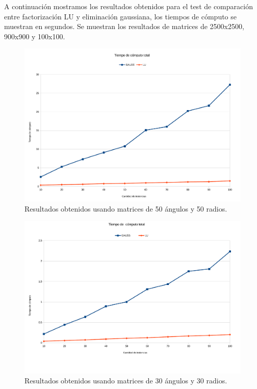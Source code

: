 A continuación mostramos los resultados obtenidos para el test de comparación entre factorización LU y eliminación gaussiana, los tiempos de cómputo se muestran en segundos. Se muestran los resultados de matrices de 2500x2500, 900x900 y 100x100. 


\begin{figure}[H]{}
\centering
\includegraphics[scale=0.5]{graphs/gaussVsLU1.pdf}
\caption{Resultados obtenidos usando matrices de 50 ángulos y 50 radios.}
\label{gaussVsLU1}
\end{figure}

\begin{figure}[H]{}
\centering
\includegraphics[scale=0.5]{graphs/gaussVsLU2.pdf}
\caption{Resultados obtenidos usando matrices de 30 ángulos y 30 radios.}
\label{gaussVsLU2}
\end{figure}

